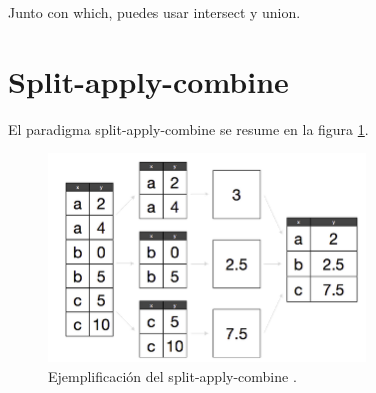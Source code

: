 \documentclass[]{article}
\newenvironment{Shaded}{\begin{snugshade}}{\end{snugshade}}
\newcommand{\KeywordTok}[1]{\textcolor[rgb]{0.13,0.29,0.53}{\textbf{{#1}}}}
\newcommand{\DecValTok}[1]{\textcolor[rgb]{0.00,0.00,0.81}{{#1}}}
\newcommand{\FloatTok}[1]{\textcolor[rgb]{0.00,0.00,0.81}{{#1}}}
\newcommand{\StringTok}[1]{\textcolor[rgb]{0.31,0.60,0.02}{{#1}}}
\newcommand{\NormalTok}[1]{{#1}}
\begin{document}
Junto con which, puedes usar intersect y union.

\begin{Shaded}
\end{Shaded}

\section{Split-apply-combine}\label{split-apply-combine}

El paradigma split-apply-combine se resume en la figura \ref{fig:sac}.

\begin{figure}[h]
    \centering
    \includegraphics[width=0.75\textwidth]{../img/01_s-a-c.png}
    \caption{Ejemplificación del split-apply-combine \textcite[Split-Apply-Combine]{vaidyanathan2014r}.}
    \label{fig:sac}
\end{figure}
\end{document}
